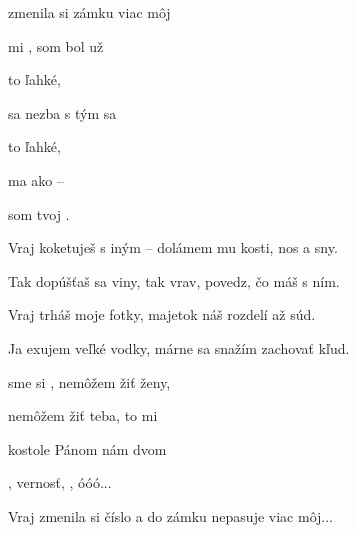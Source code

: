 


   

\zs
{} zmenila si   zámku  viac môj  

 mi ,   som bol už 
\ks

\zr
{} to  ľahké,   

 sa nezba s tým sa 

 to  ľahké, 

 ma  ako  --

som tvoj .   
\kr

\zs
Vraj koketuješ s iným -- dolámem mu kosti, nos a sny.

Tak dopúšťaš sa viny, tak vrav, povedz, čo máš s ním.
\ks

\zr  \kr

\zs
Vraj trháš moje fotky, majetok náš rozdelí až súd.

Ja exujem veľké vodky, márne sa snažím zachovať kľud.
\ks

\zr  \kr

\zs
{} sme si ,  nemôžem žiť  ženy,

 nemôžem žiť  teba, to mi 

 kostole  Pánom   nám dvom

 , vernosť,   , óóó...
\ks

\zr     \kr

\zs
Vraj zmenila si číslo a do zámku nepasuje viac môj...
\ks

\kp





